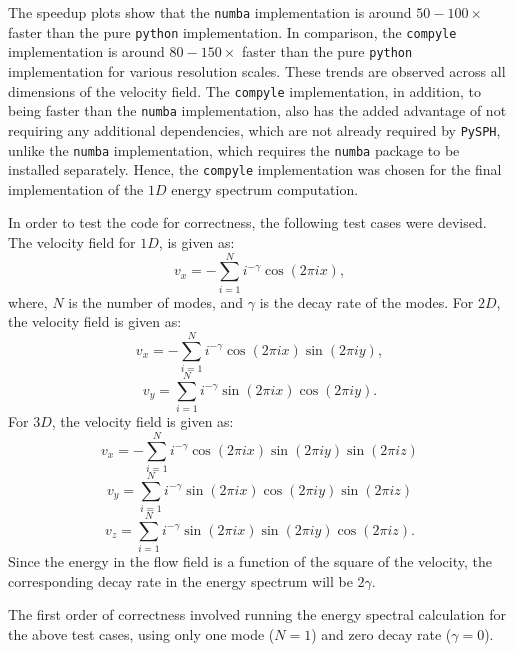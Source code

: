 The speedup plots show that the \texttt{numba} implementation is around $50-100\times$ faster than the pure \texttt{python} implementation. In comparison, the \texttt{compyle} implementation is around $80-150\times$ faster than the pure \texttt{python} implementation for various resolution scales. These trends are observed across all dimensions of the velocity field. The \texttt{compyle} implementation, in addition, to being faster than the \texttt{numba} implementation, also has the added advantage of not requiring any additional dependencies, which are not already required by \texttt{PySPH}, unlike the \texttt{numba} implementation, which requires the \texttt{numba} package to be installed separately. Hence, the \texttt{compyle} implementation was chosen for the final implementation of the $1D$ energy spectrum computation.

In order to test the code for correctness, the following test cases were devised. The velocity field for $1D$, is given as:
\begin{equation}
    v_x = - \sum_{i=1}^{N} i^{-\gamma} \cos(2 \pi i x),
\end{equation}
where, $N$ is the number of modes, and $\gamma$ is the decay rate of the modes.
For $2D$, the velocity field is given as:
\begin{equation}
    v_x = - \sum_{i=1}^{N} i^{-\gamma} \cos(2 \pi i x) \sin(2 \pi i y),
\end{equation}
\begin{equation}
    v_y = \sum_{i=1}^{N} i^{-\gamma} \sin(2 \pi i x) \cos(2 \pi i y).
\end{equation}
For $3D$, the velocity field is given as:
\begin{equation}
    v_x = - \sum_{i=1}^{N} i^{-\gamma} \cos(2 \pi i x) \sin(2 \pi i y) \sin(2 \pi i z)
\end{equation}
\begin{equation}
    v_y = \sum_{i=1}^{N} i^{-\gamma} \sin(2 \pi i x) \cos(2 \pi i y) \sin(2 \pi i z)
\end{equation}
\begin{equation}
    v_z = \sum_{i=1}^{N} i^{-\gamma} \sin(2 \pi i x) \sin(2 \pi i y) \cos(2 \pi i z).
\end{equation}
Since the energy in the flow field is a function of the square of the velocity, the corresponding decay rate in the energy spectrum will be $2\gamma$.

The first order of correctness involved running the energy spectral calculation for the above test cases, using only one mode ($N=1$) and zero decay rate ($\gamma=0$).

